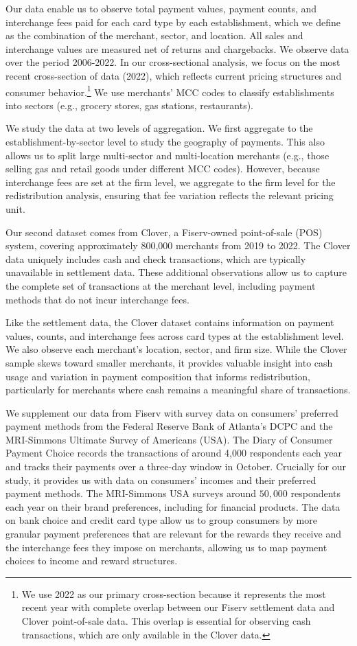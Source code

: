 \documentclass[11pt,english]{article}
\theoremstyle{remark}
\begin{document}
Our data enable us to observe total payment values, payment counts, and interchange fees paid for each card type by each establishment, which we define as the combination of the merchant, sector, and location.
All sales and interchange values are measured net of returns and chargebacks. We observe data over the period 2006-2022. In our cross-sectional analysis, we focus on the most recent cross-section of data (2022), which reflects current pricing structures and consumer behavior.\footnote{We use 2022 as our primary cross-section because it represents the most recent year with complete overlap between our Fiserv settlement data and Clover point-of-sale data. This overlap is essential for observing cash transactions, which are only available in the Clover data.} 
We use merchants' MCC codes to classify establishments into sectors (e.g., grocery stores, gas stations, restaurants).

We study the data at two levels of aggregation. We first aggregate to the establishment-by-sector level to study the geography of payments.
This also allows us to split large multi-sector and multi-location merchants (e.g., those selling gas and retail goods under different MCC codes).
However, because interchange fees are set at the firm level, we aggregate to the firm level for the redistribution analysis, ensuring that fee variation reflects the relevant pricing unit.

Our second dataset comes from Clover, a Fiserv-owned point-of-sale (POS) system, covering approximately 800,000 merchants from 2019 to 2022.
The Clover data uniquely includes cash and check transactions, which are typically unavailable in settlement data.
These additional observations allow us to capture the complete set of transactions at the merchant level, including payment methods that do not incur interchange fees.

Like the settlement data, the Clover dataset contains information on payment values, counts, and interchange fees across card types at the establishment level.
We also observe each merchant's location, sector, and firm size.
While the Clover sample skews toward smaller merchants, it provides valuable insight into cash usage and variation in payment composition that informs redistribution, particularly for merchants where cash remains a meaningful share of transactions.

We supplement our data from Fiserv with survey data on consumers' preferred payment methods from the Federal Reserve Bank of Atlanta's DCPC and the MRI-Simmons Ultimate Survey of Americans (USA).
The Diary of Consumer Payment Choice records the transactions of around 4,000 respondents each year and tracks their payments over a three-day window in October.
Crucially for our study, it provides us with data on consumers' incomes and their preferred payment methods.
The MRI-Simmons USA surveys around $50,000$ respondents each year on their brand preferences, including for financial products.
The data on bank choice and credit card type allow us to group consumers by more granular payment preferences that are relevant for the rewards they receive and the interchange fees they impose on merchants, allowing us to map payment choices to income and reward structures.
\end{document}
